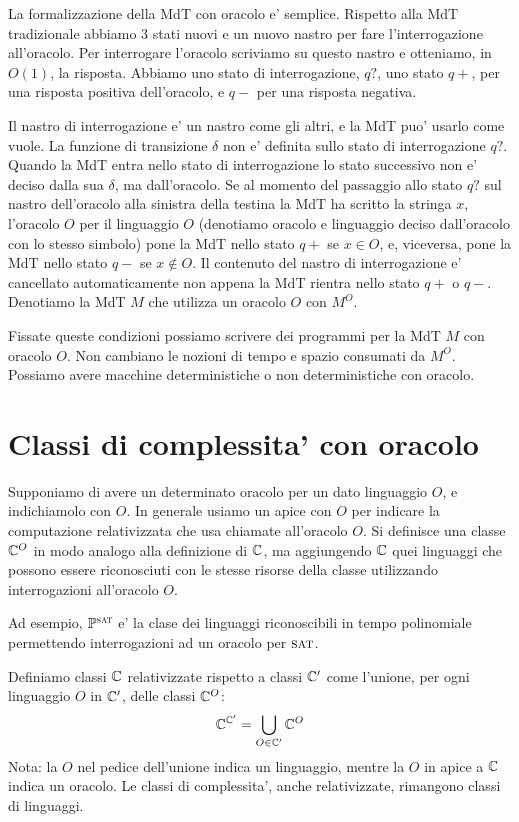 La formalizzazione della MdT con oracolo e' semplice. Rispetto alla MdT tradizionale abbiamo 3 stati
nuovi e un nuovo nastro per fare l'interrogazione all'oracolo. Per interrogare l'oracolo scriviamo
su questo nastro e otteniamo, in $O(1)$, la risposta. Abbiamo uno stato di interrogazione, $q?$, uno
stato $q+$, per una risposta positiva dell'oracolo, e $q-$ per una risposta negativa.

Il nastro di interrogazione e' un nastro come gli altri, e la MdT puo' usarlo come vuole. La
funzione di transizione $\delta$ non e' definita sullo stato di interrogazione $q?$. Quando la MdT
entra nello stato di interrogazione lo stato successivo non e' deciso dalla sua $\delta$, ma
dall'oracolo. Se al momento del passaggio allo stato $q?$ sul nastro dell'oracolo alla sinistra
della testina la MdT ha scritto la stringa $x$, l'oracolo $O$ per il linguaggio $O$ (denotiamo
oracolo e linguaggio deciso dall'oracolo con lo stesso simbolo) pone la MdT nello stato $q+$ se $x \in
O$, e, viceversa, pone la MdT nello stato $q-$ se $x \notin O$. Il contenuto del nastro di
interrogazione e' cancellato automaticamente non appena la MdT rientra nello stato $q+$ o $q-$.
Denotiamo la MdT $M$ che utilizza un oracolo $O$ con $M^{O}$.

Fissate queste condizioni possiamo scrivere dei programmi per la MdT $M$ con oracolo $O$. Non
cambiano le nozioni di tempo e spazio consumati da $M^{O}$. Possiamo avere macchine deterministiche
o non deterministiche con oracolo.

\section{Classi di complessita' con oracolo}

Supponiamo di avere un determinato oracolo per un dato linguaggio $O$, e indichiamolo con $O$.  In
generale usiamo un apice con $O$ per indicare la computazione relativizzata che usa chiamate
all'oracolo $O$.  Si definisce una classe $\mathbb{C}^{O}$ in modo analogo alla definizione di
$\mathbb{C}$, ma aggiungendo $\mathbb{C}$ quei linguaggi che possono essere riconosciuti con le stesse
risorse della classe utilizzando interrogazioni all'oracolo $O$.

Ad esempio, $\mathbb{P}^{\textsc{sat}}$ e' la clase dei linguaggi riconoscibili in tempo polinomiale
permettendo interrogazioni ad un oracolo per $\textsc{sat}$.

Definiamo classi $\mathbb{C}$ relativizzate rispetto a classi $\mathbb{C}'$ come l'unione, per ogni
linguaggio $O$ in $\mathbb{C}'$, delle classi $\mathbb{C}^{O}$:
\begin{equation*}
    \mathbb{C}^{\mathbb{C}'} = \bigcup_{O \in \mathbb{C}'}\mathbb{C}^{O}
\end{equation*}
Nota: la $O$ nel pedice dell'unione indica un linguaggio, mentre la $O$ in apice a $\mathbb{C}$ indica
un oracolo. Le classi di complessita', anche relativizzate, rimangono classi di linguaggi.

